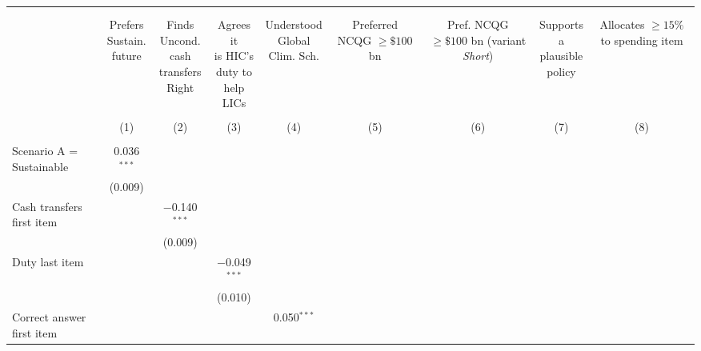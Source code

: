 
\begin{tabular}{@{\extracolsep{5pt}}lcccccccc} 
\\[-1.8ex]\hline 
\hline \\[-1.8ex] 
\\[-1.8ex] & \makecell{Prefers\\Sustain.\\future} & \makecell{Finds\\Uncond.\\cash\\transfers\\Right} & \makecell{Agrees it\\is HIC's\\duty to\\help LICs} & \makecell{Understood\\Global\\Clim. Sch.} & \makecell{Preferred\\NCQG\\$\geq\$ 100$ bn} & \makecell{Pref. NCQG\\$\geq\$ 100$ bn\\(variant\\ \textit{Short})} & \makecell{Supports\\a\\plausible\\policy} & \makecell{Allocates\\$\geq 15\%$ to\\spending\\item} \\ 
\\[-1.8ex] & (1) & (2) & (3) & (4) & (5) & (6) & (7) & (8)\\ 
\hline \\[-1.8ex] 
 Scenario A = Sustainable & 0.036$^{***}$ &  &  &  &  &  &  &  \\ 
  & (0.009) &  &  &  &  &  &  &  \\ 
  Cash transfers first item &  & $-$0.140$^{***}$ &  &  &  &  &  &  \\ 
  &  & (0.009) &  &  &  &  &  &  \\ 
  Duty last item &  &  & $-$0.049$^{***}$ &  &  &  &  &  \\ 
  &  &  & (0.010) &  &  &  &  &  \\ 
  Correct answer first item &  &  &  & 0.050$^{***}$ &  &  &  &  \\ 

\end{tabular}
